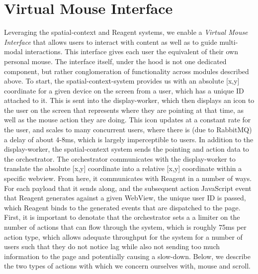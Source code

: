 \section{Virtual Mouse Interface}

Leveraging the spatial-context and Reagent systems, we enable a \textit{Virtual Mouse Interface} that allows users to interact with content
as well as to guide multi-modal interactions. This interface gives each user the equivalent of their own personal mouse. The interface itself, under the hood is not one dedicated component, but rather conglomeration of functionality across modules described above. To start, the spatial-context-system provides us with
an absolute [x,y] coordinate for a given device on
the screen from a user, which has a unique ID attached to it. This is sent into the
display-worker, which then displays an icon to
the user on the screen that represents where they
are pointing at that time, as well as the mouse
action they are doing. This icon updates at a
constant rate for the user, and scales to many concurrent users, where there is (due to RabbitMQ) a delay of about 4-8ms, which is largely imperceptible to users. In addition to the display-worker, the
spatial-context system sends the pointing and action
data to the orchestrator. The orchestrator communicates with the display-worker to translate the
absolute [x,y] coordinate into a relative [x,y] coordinate within a specific webview. From here, it
communicates with Reagent in a number of ways. For each payload that it sends along, and the subsequent action JavaScript event that Reagent generates against a given WebView, the unique user ID is passed, which Reagent binds to the generated events that are dispatched to the page. First, it is important to denotate that the orchestrator sets a a limiter on the number of actions that can flow through the system, which is roughly 75ms per action type, which allows adequate throughput for the system for a number of users such that they do not notice lag while also not sending too much information to the page and potentially causing a slow-down. Below, we describe the two types of actions with which we concern ourselves with, mouse and scroll.

